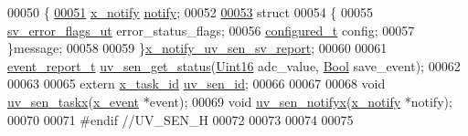 \begin{DoxyCode}
00050 \{
\hypertarget{a00020_source_l00051}{}\hyperlink{a00020_a8e6a04c2283f9fd7b8dcbc62faba5847}{00051}     \hyperlink{a00036_df/d4c/a00851}{x\_notify}            \hyperlink{a00020_a8e6a04c2283f9fd7b8dcbc62faba5847}{notify};
00052 
\hypertarget{a00020_source_l00053}{}\hyperlink{a00020}{00053}     \textcolor{keyword}{struct}
00054     \{
00055       \hyperlink{a00022_d2/d5a/a00792}{sv\_error\_flags\_ut}      error\_status\_flags;
00056       \hyperlink{a00021_d6/d9c/a00352}{configured\_t}           config;
00057     \}message;
00058 
00059 \}\hyperlink{a00020_da/d5b/a00868}{x\_notify\_uv\_sen\_sv\_report};
00060 
00061 \hyperlink{a00021_d6/d66/a00441}{event\_report\_t} \hyperlink{a00020_a354d25047e79397dbe5525178f19cae0}{uv\_sen\_get\_status}(\hyperlink{a00072_a59a9f6be4562c327cbfb4f7e8e18f08b}{Uint16} adc\_value,
      \hyperlink{a00072_a253b248072cfc8bd812c69acd0046eed}{Bool} save\_event);
00062 
00063 
00065 \textcolor{keyword}{extern} \hyperlink{a00036_ad5c3c5fbfd3e4aadf22830395484a71d}{x\_task\_id} \hyperlink{a00020_afd789f3f9ea182d28d4f16db0d8d5652}{uv\_sen\_id};
00066 
00067 
00068 \textcolor{keywordtype}{void} \hyperlink{a00020_ab4e931568892f0b46a2571d3c480f5c8}{uv\_sen\_taskx}(\hyperlink{a00036_de/d37/a00849}{x\_event} *event);
00069 \textcolor{keywordtype}{void} \hyperlink{a00020_ae2617634df4d3055161f7fb1f148f6da}{uv\_sen\_notifyx}(\hyperlink{a00036_df/d4c/a00851}{x\_notify} *notify);
00070 
00071 \textcolor{preprocessor}{#endif //UV\_SEN\_H}
00072 
00073 
00074 
00075 
\end{DoxyCode}

